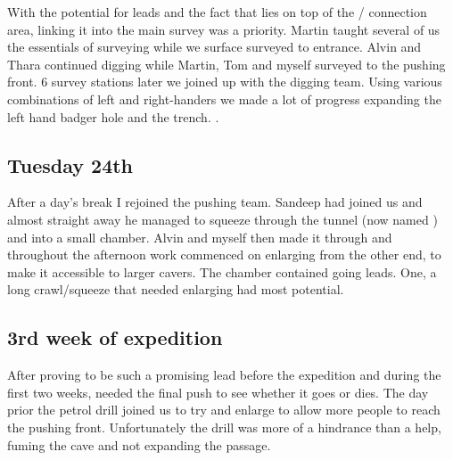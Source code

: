 With the potential for leads and the fact that  lies on top of the
 /  connection area, linking it into the
main survey was a priority. Martin taught several of us the essentials
of surveying while we surface surveyed to  entrance. Alvin and Thara
continued digging while Martin, Tom and myself surveyed to the pushing
front. 6 survey stations later we joined up with the digging team. Using
various combinations of left and right-handers we made a lot of progress
expanding the left hand badger hole and the trench. .

\subsection{Tuesday 24th}

After a day's break I rejoined the  pushing team. Sandeep had joined
us and almost straight away he managed to squeeze through the tunnel
(now named ) and into a small chamber. Alvin and myself
then made it through and throughout the afternoon work commenced on
enlarging  from the other end, to make it accessible to
larger cavers. The chamber contained going leads. One, a long
crawl/squeeze that needed enlarging had most potential.

\subsection{3rd week of expedition}

After proving to be such a promising lead before the expedition and
during the first two weeks,  needed the final push to see
whether it goes or dies. The day prior the petrol drill joined us to try
and enlarge  to allow more people to reach the pushing
front. Unfortunately the drill was more of a hindrance than a help,
fuming the cave and not expanding the passage.

